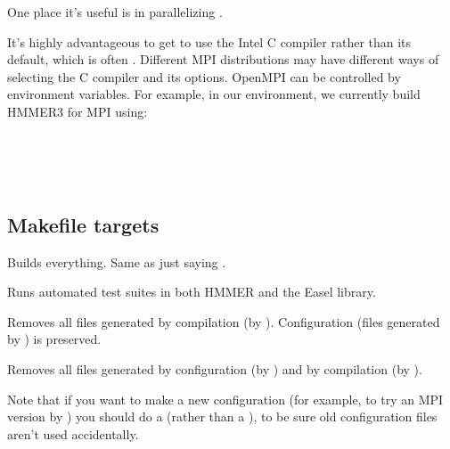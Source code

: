 One place it's useful is in parallelizing .

It's highly advantageous to get  to use the Intel C
compiler rather than its default, which is often . Different
MPI distributions may have different ways of selecting the C compiler
and its options. OpenMPI can be controlled by environment variables.
For example, in our environment, we currently build HMMER3 for MPI
using:

\\
\\
\\


\subsection{Makefile targets}

\begin{sreitems}{}
\item[\emprog{all}]
  Builds everything. Same as just saying .

\item[\emprog{check}]
  Runs automated test suites in both HMMER and the Easel library.

\item[\emprog{clean}]
  Removes all files generated by compilation (by
  ). Configuration (files generated by
  ) is preserved.

\item[\emprog{distclean}]
Removes all files generated by configuration (by )
and by compilation (by ). 

Note that if you want to make a new configuration (for example, to try
an MPI version by ) you should
do a  (rather than a ), to be
sure old configuration files aren't used accidentally.
\end{sreitems}




